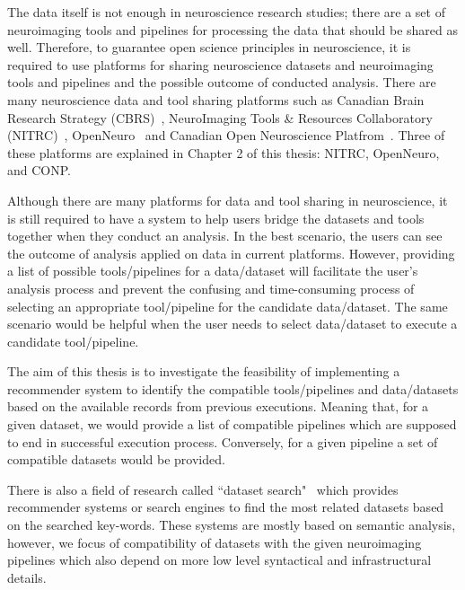
The data itself is not enough in neuroscience research studies; there are a set of neuroimaging tools and pipelines for processing the data that should be shared as well. Therefore, to guarantee open science principles in neuroscience, it is required to use platforms for sharing neuroscience datasets and neuroimaging tools and pipelines and the possible outcome of conducted analysis. There are many neuroscience data and tool sharing platforms such as Canadian Brain Research Strategy (CBRS)~\cite{CBRS}, NeuroImaging Tools \& Resources Collaboratory (NITRC)~\cite{nitrc}, OpenNeuro~\cite{markiewicz2021openneuro} and Canadian Open Neuroscience Platfrom~\cite{conp}. Three of these platforms are explained in Chapter 2 of this thesis: NITRC, OpenNeuro, and CONP.



Although there are many platforms for data and tool sharing in neuroscience, it is still required to have a system to help users bridge the datasets and tools together when they conduct an analysis. In the best scenario, the users can see the outcome of analysis applied on data in current platforms. However, providing a list of possible tools/pipelines for a data/dataset will facilitate the user's analysis process and prevent the confusing and time-consuming process of selecting an appropriate tool/pipeline for the candidate data/dataset. The same scenario would be helpful when the user needs to select data/dataset to execute a candidate tool/pipeline.


The aim of this thesis is to investigate the feasibility of implementing a recommender system to identify the compatible tools/pipelines and data/datasets based on the available records from previous executions. Meaning that, for a given dataset, we would provide a list of compatible pipelines which are supposed to end in successful execution process. Conversely, for a given pipeline a set of compatible datasets would be provided. 

There is also a field of research called ``dataset search"~\cite{chapman2020dataset} which provides recommender systems or search engines to find the most related datasets based on the searched key-words. These systems are mostly based on semantic analysis, however, we focus of compatibility of datasets with the given neuroimaging pipelines which also depend on more low level syntactical and infrastructural details.


